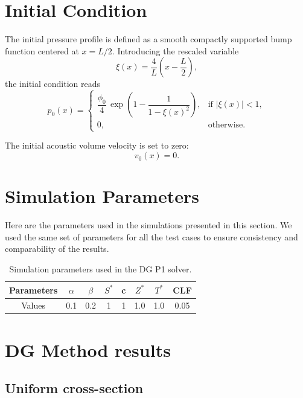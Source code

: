 \documentclass[11pt,a4paper]{report}
\theoremstyle{plain}
\theoremstyle{definition}
\begin{document}
\newpage
\section{Initial Condition}
The initial pressure profile is defined as a smooth compactly supported bump function
centered at $x=L/2$. Introducing the rescaled variable
\begin{equation}
\xi(x) = \frac{4}{L}\left(x - \frac{L}{2}\right),
\end{equation}
the initial condition reads
\begin{equation}
p_0(x) =
\begin{cases}
\dfrac{\phi_0}{4}\,
\exp\!\left(1 - \dfrac{1}{1-\xi(x)^2}\right),
& \text{if } |\xi(x)| < 1, \\[1.2ex]
0, & \text{otherwise}.
\end{cases}
\end{equation}

The initial acoustic volume velocity is set to zero:
\begin{equation}
v_0(x) = 0.
\end{equation}

\section{Simulation Parameters}
Here are the parameters used in the simulations presented in this section.
We used the same set of parameters for all the test cases to ensure consistency 
and comparability of the results.
\begin{table}[h!]
\centering
\begin{tabular}{c ccccccc}
\hline
Parameters & $\alpha$ & $\beta$ & $S^\ast$ & c & $Z^\ast$ & $T^\ast$ & CLF \\
\hline
Values & 0.1 & 0.2 & 1 & 1 & 1.0 & 1.0 & 0.05 \\
\hline
\end{tabular}
\caption{Simulation parameters used in the DG P1 solver.}
\label{tab:sim_parameters}
\end{table}

\section{DG Method results}

\subsection{Uniform cross-section}
\end{document}
